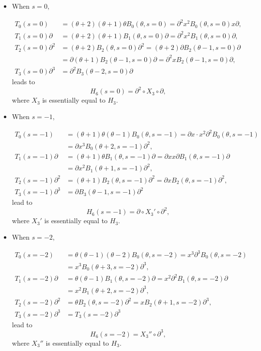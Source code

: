\documentclass[a4paper,12pt]{article}
\theoremstyle{definition}
\theoremstyle{remark}
\numberwithin{equation}{section} %
\begin{document}
\begin{itemize}
  \item When $s=0$,\par\noindent
  $$\begin{array}{ll}
    T_0(s=0)&=(\theta +2)(\theta +1)\theta B_0(\theta ,s=0)=\partial^2x^2B_0(\theta ,s=0)x\partial ,\\
    T_1(s=0)\partial &=(\theta +2)(\theta +1)B_1(\theta ,s=0)\partial =\partial^2x^2B_1(\theta ,s=0)\partial ,\\
    T_2(s=0)\partial ^2&=(\theta +2)B_2(\theta ,s=0)\partial ^2=(\theta +2)\partial B_2(\theta -1,s=0)\partial \\
    &=\partial (\theta +1)B_2(\theta -1,s=0)\partial =\partial ^2xB_2(\theta -1,s=0)\partial ,\\
    T_3(s=0)\partial ^3&=\partial ^2B_3(\theta -2,s=0)\partial \end{array}$$
  leads to
  $$H_6(s=0)=\partial ^2\circ X_3\circ \partial ,$$
  where $X_3$ is essentially equal to $H_3$.

 \item When $s=-1$,\par\noindent
  $$\begin{array}{ll}
   T_0(s=-1)&=(\theta +1)\theta (\theta -1)B_0(\theta ,s=-1)=\partial x\cdot x^2\partial ^2B_0(\theta ,s=-1)\\
   &=\partial  x^3B_0(\theta +2,s=-1)\partial ^2,\\
   T_1(s=-1)\partial &=(\theta +1)\theta B_1(\theta ,s=-1)\partial =\partial x x\partial  B_1(\theta ,s=-1)\partial \\
   &=\partial  x^2B_1(\theta +1,s=-1)\partial ^2,\\
    T_2(s=-1)\partial ^2&=(\theta +1)B_2(\theta ,s=-1)\partial ^2=\partial  x B_2(\theta ,s=-1)\partial ^2,\\
    T_3(s=-1)\partial ^3&=\partial  B_3(\theta -1,s=-1)\partial ^2\end{array}$$
  lead to
  $$H_6(s=-1)=\partial \circ X_3'\circ \partial ^2,$$
  where $X_3'$ is essentially equal to $H_3$.

\item When $s=-2$,\par\noindent
  $$\begin{array}{ll}
   T_0(s=-2)&=\theta (\theta -1)(\theta -2)B_0(\theta ,s=-2)=x^3\partial ^3B_0(\theta ,s=-2)\\
   &=x^3B_0(\theta +3,s=-2)\partial ^3,\\
   T_1(s=-2)\partial &=\theta (\theta -1)B_1(\theta ,s=-2)\partial =x^2\partial ^2 B_1(\theta ,s=-2)\partial \\
   &=x^2B_1(\theta +2,s=-2)\partial ^3,\\
    T_2(s=-2)\partial ^2&=\theta  B_2(\theta ,s=-2)\partial ^2=x B_2(\theta+1,s=-2)\partial ^3,\\
    T_3(s=-2)\partial ^3&=T_3(s=-2)\partial ^3\end{array}$$
  lead to
  $$H_6(s=-2)=X_3''\circ \partial ^3,$$
  where $X_3''$ is essentially equal to $H_3$.
\end{itemize}  
\end{document}
